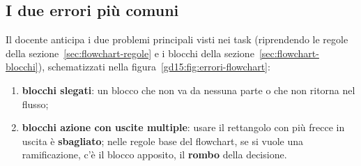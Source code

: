 \subsection{I due errori più comuni}

Il docente anticipa i due problemi principali visti nei task (riprendendo le
regole della sezione~\ref{sec:flowchart-regole} e i blocchi della
sezione~\ref{sec:flowchart-blocchi}), schematizzati nella
figura~\ref{gd15:fig:errori-flowchart}:
\begin{enumerate}
  \item \textbf{blocchi slegati}: un blocco che non va da nessuna parte o
        che non ritorna nel flusso;
  \item \textbf{blocchi azione con uscite multiple}: usare il rettangolo
        con più frecce in uscita è \textbf{sbagliato}; nelle regole base del
        flowchart, se si vuole una ramificazione, c'è il blocco apposito, il
        \textbf{rombo} della decisione.
\end{enumerate}

